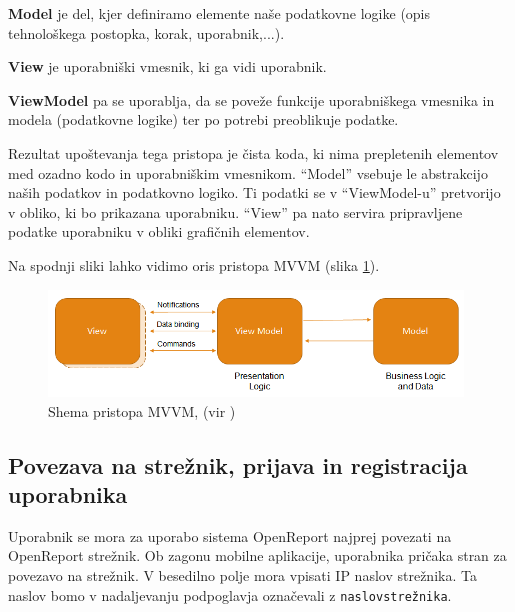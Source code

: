 \documentclass[a4paper, 12pt]{book}
\begin{document}
\textbf{Model} je del, kjer definiramo elemente naše podatkovne logike (opis tehnološkega postopka, korak, uporabnik,...).

\textbf{View} je uporabniški vmesnik, ki ga vidi uporabnik.

\textbf{ViewModel} pa se uporablja, da se poveže funkcije uporabniškega vmesnika in modela (podatkovne logike) ter po potrebi preoblikuje podatke.

Rezultat upoštevanja tega pristopa je čista koda, ki nima prepletenih elementov med ozadno kodo in uporabniškim vmesnikom.
\enquote{Model} vsebuje le abstrakcijo naših podatkov in podatkovno logiko.
Ti podatki se v \enquote{ViewModel-u} pretvorijo v obliko, ki bo prikazana uporabniku.
\enquote{View} pa nato servira pripravljene podatke uporabniku v obliki grafičnih elementov.

Na spodnji sliki lahko vidimo oris pristopa MVVM (slika \ref{mvvm}).

\begin{figure}[H]
\begin{center}
\includegraphics[width=11cm]{mvvm}
\end{center}
	\caption{Shema pristopa MVVM, (vir \cite{mvvmimage})}
\label{mvvm}
\end{figure}

\subsection{Povezava na strežnik, prijava in registracija uporabnika}

Uporabnik se mora za uporabo sistema OpenReport najprej povezati na OpenReport strežnik.
Ob zagonu mobilne aplikacije, uporabnika pričaka stran za povezavo na strežnik.
V besedilno polje mora vpisati IP naslov strežnika.
Ta naslov bomo v nadaljevanju podpoglavja označevali z \texttt{naslovstrežnika}.

\end{document}
